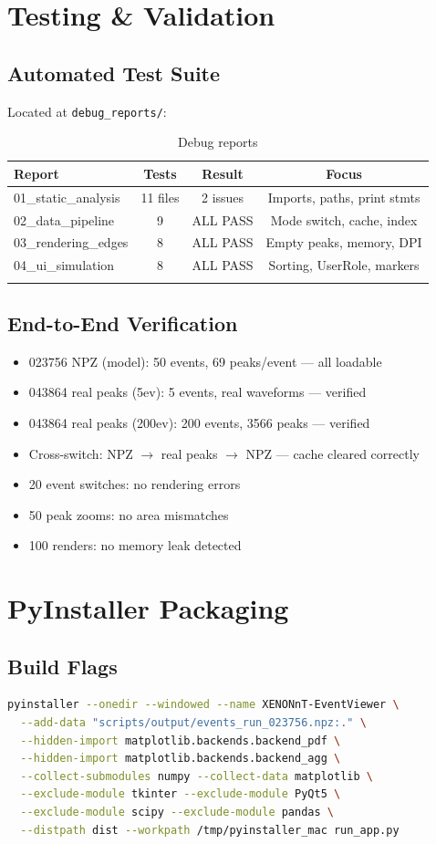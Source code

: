 \documentclass[12pt,a4paper]{article}
\begin{document}
\section{Testing \& Validation}

\subsection{Automated Test Suite}
Located at \texttt{debug\_reports/}:

\begin{longtable}{|l|c|c|c|}
\hline
\textbf{Report} & \textbf{Tests} & \textbf{Result} & \textbf{Focus} \\
\hline
01\_static\_analysis & 11 files & 2 issues & Imports, paths, print stmts \\
02\_data\_pipeline & 9 & ALL PASS & Mode switch, cache, index \\
03\_rendering\_edges & 8 & ALL PASS & Empty peaks, memory, DPI \\
04\_ui\_simulation & 8 & ALL PASS & Sorting, UserRole, markers \\
\hline
\caption{Debug reports}
\end{longtable}

\subsection{End-to-End Verification}
\begin{itemize}[itemsep=2pt]
\item 023756 NPZ (model): 50 events, 69 peaks/event --- all loadable
\item 043864 real peaks (5ev): 5 events, real waveforms --- verified
\item 043864 real peaks (200ev): 200 events, 3566 peaks --- verified
\item Cross-switch: NPZ $\to$ real peaks $\to$ NPZ --- cache cleared correctly
\item 20 event switches: no rendering errors
\item 50 peak zooms: no area mismatches
\item 100 renders: no memory leak detected
\end{itemize}

\section{PyInstaller Packaging}

\subsection{Build Flags}
\begin{lstlisting}[language=bash]
pyinstaller --onedir --windowed --name XENONnT-EventViewer \
  --add-data "scripts/output/events_run_023756.npz:." \
  --hidden-import matplotlib.backends.backend_pdf \
  --hidden-import matplotlib.backends.backend_agg \
  --collect-submodules numpy --collect-data matplotlib \
  --exclude-module tkinter --exclude-module PyQt5 \
  --exclude-module scipy --exclude-module pandas \
  --distpath dist --workpath /tmp/pyinstaller_mac run_app.py
\end{lstlisting}
\end{document}
